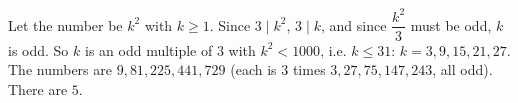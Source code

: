Let the number be $k^2$ with $k\ge1$. Since $3\mid k^2$, $3\mid k$, and since $\dfrac{k^2}3$ must be odd, $k$ is odd. So $k$ is an odd multiple of $3$ with $k^2<1000$, i.e. $k\le31$: $k=3,9,15,21,27$. The numbers are $9,81,225,441,729$ (each is $3$ times $3,27,75,147,243$, all odd). There are $\boxed{5}$.
